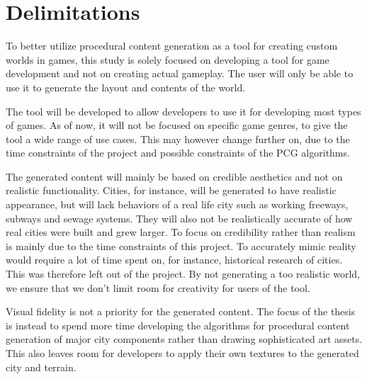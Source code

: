 \section{Delimitations}
\label{section:delimitations}

To better utilize procedural content generation as a tool for creating custom worlds in games, this study is solely focused on developing a tool for game development and not on creating actual gameplay. The user will only be able to use it to generate the layout and contents of the world.

The tool will be developed to allow developers to use it for developing most types of games. As of now, it will not be focused on specific game genres, to give the tool a wide range of use cases. This may however change further on, due to the time constraints of the project and possible constraints of the PCG algorithms.

The generated content will mainly be based on credible aesthetics and not on realistic functionality. Cities, for instance, will be generated to have realistic appearance, but will lack behaviors of a real life city such as working freeways, subways and sewage systems. They will also not be realistically accurate of how real cities were built and grew larger. To focus on credibility rather than realism is mainly due to the time constraints of this project. To accurately mimic reality would require a lot of time spent on, for instance, historical research of cities. This was therefore left out of the project. By not generating a too realistic world, we ensure that we don't limit room for creativity for users of the tool.

Visual fidelity is not a priority for the generated content. The focus of the thesis is instead to spend more time developing the algorithms for procedural content generation of major city components rather than drawing sophisticated art assets. This also leaves room for developers to apply their own textures to the generated city and terrain.